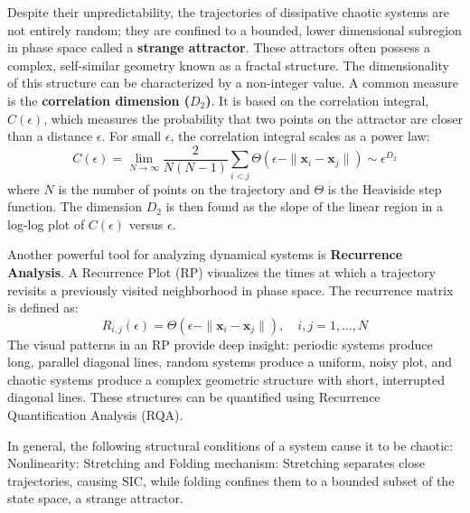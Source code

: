 \documentclass[a4paper,12pt]{article}
\begin{document}
Despite their unpredictability, the trajectories of dissipative chaotic systems are not entirely random; they are confined to a bounded, lower dimensional subregion in phase space called a \textbf{strange attractor}. These attractors often possess a complex, self-similar geometry known as a fractal structure. The dimensionality of this structure can be characterized by a non-integer value. A common measure is the \textbf{correlation dimension ($D_2$)}. It is based on the correlation integral, $C(\epsilon)$, which measures the probability that two points on the attractor are closer than a distance $\epsilon$. For small $\epsilon$, the correlation integral scales as a power law:
\begin{equation}
    C(\epsilon) = \lim_{N \to \infty} \frac{2}{N(N-1)} \sum_{i<j} \Theta(\epsilon - \|\mathbf{x}_i - \mathbf{x}_j\|) \sim \epsilon^{D_2}
\end{equation}
where $N$ is the number of points on the trajectory and $\Theta$ is the Heaviside step function. The dimension $D_2$ is then found as the slope of the linear region in a log-log plot of $C(\epsilon)$ versus $\epsilon$.

Another powerful tool for analyzing dynamical systems is \textbf{Recurrence Analysis}. A Recurrence Plot (RP) visualizes the times at which a trajectory revisits a previously visited neighborhood in phase space. The recurrence matrix is defined as:
\begin{equation}
    R_{i,j}(\epsilon) = \Theta(\epsilon - \|\mathbf{x}_i - \mathbf{x}_j\|), \quad i,j = 1, \dots, N
\end{equation}
The visual patterns in an RP provide deep insight: periodic systems produce long, parallel diagonal lines, random systems produce a uniform, noisy plot, and chaotic systems produce a complex geometric structure with short, interrupted diagonal lines. These structures can be quantified using Recurrence Quantification Analysis (RQA).



In general, the following structural conditions of a system cause it to be chaotic:
Nonlinearity: %
Stretching and Folding mechanism: Stretching separates close trajectories, causing SIC, while folding confines them to a bounded subset of the state space, a strange attractor.
\end{document}
